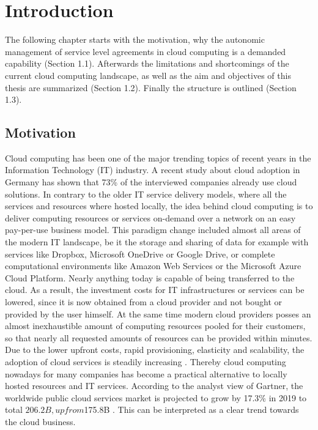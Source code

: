
\chapter{Introduction} %
\label{Introduction} %
The following chapter starts with the motivation, why the autonomic management of service level agreements in cloud computing is a demanded capability (Section 1.1). Afterwards the limitations and shortcomings of the current cloud computing landscape, as well as the aim and objectives of this thesis are summarized (Section 1.2). Finally the structure is outlined (Section 1.3).

\section{Motivation}
Cloud computing has been one of the major trending topics of recent years in the Information Technology (IT) industry. A recent study about cloud adoption in Germany \cite{BITKOM19} has shown that 73\% of the interviewed companies already use cloud solutions. In contrary to the older IT service delivery models, where all the services and resources where hosted locally, the idea behind cloud computing is to deliver computing resources or services on-demand over a network on an easy pay-per-use business model\cite{NIST}. This paradigm change included almost all areas of the modern IT landscape, be it the storage and sharing of data for example with services like Dropbox\cite{Dropbox}, Microsoft OneDrive\cite{OneDrive} or Google Drive\cite{GoogleDrive}, or complete computational environments like Amazon Web Services\cite{AWS} or the Microsoft Azure Cloud Platform\cite{Azure}. Nearly anything today is capable of being transferred to the cloud. As a result,  the investment costs for IT infrastructures or services can be lowered, since it is now obtained from a cloud provider and not bought or provided by the user himself. At the same time modern cloud providers posses an almost inexhaustible amount of computing resources pooled for their customers, so that nearly all requested amounts of resources can be provided within minutes.  Due to the lower upfront costs, rapid provisioning, elasticity and scalability, the adoption of cloud services is steadily increasing \cite{IDC}. Thereby cloud computing nowadays for many companies has become a practical alternative to locally hosted resources and IT services. According to the analyst view of Gartner, the worldwide public cloud services market is projected to grow by 17.3\% in 2019 to total $206.2B, up from $175.8B \cite{gart19}. This can be interpreted as a clear trend towards the cloud business.


